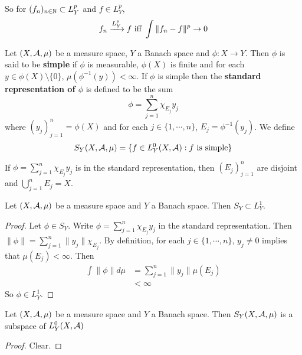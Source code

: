 \documentclass{book}
\begin{document}
	\begin{note}
	So for $(f_n)_{n \in \mathbb{N}} \subset L^p_Y$ and $f \in L^p_Y$, $$f_n \xrightarrow{L^p_Y} f \text{ iff } \int \|f_n - f\|^p \rightarrow 0$$ 
	\end{note}
	
	\begin{defn}  
	Let $(X, \mathcal{A}, \mu)$ be a measure space, $Y$ a Banach space and $\phi: X \rightarrow Y$. Then $\phi$ is said to be \textbf{simple} if $\phi$ is measurable, $\phi(X)$ is finite and for each $y \in \phi(X) \setminus \{0\}$, $\mu(\phi^{-1}(y)) < \infty$. If $\phi$ is simple then the \textbf{standard representation of $\phi$} is defined to be the sum $$\phi = \sum\limits_{j=1}^n \chi_{E_j}y_j$$ where $(y_j)_{j=1}^n = \phi(X)$ and for each $j \in \{1, \cdots, n\}$, $E_j = \phi^{-1}(y_j)$. We define $$S_Y(X, \mathcal{A}, \mu) = \{f \in L_Y^0(X, \mathcal{A}): f \text{ is simple}\}$$
	\end{defn}
	
	\begin{note}
	If $\phi = \sum\limits_{j=1}^n \chi_{E_j}y_j$ is in the standard representation, then $(E_j)_{j=1}^n$ are disjoint and $\bigcup\limits_{j=1}^n E_j = X$.
	\end{note}
	
	\begin{ex}
	Let $(X, \mathcal{A}, \mu)$ be a measure space and $Y$ a Banach space. Then $S_Y \subset L^1_Y$. 
	\end{ex}
	
	\begin{proof}
	Let $\phi \in S_Y$. Write $\phi = \sum\limits_{j=1}^n \chi_{E_j}y_j$ in the standard representation. Then $\|\phi\| = \sum\limits_{j=1}^n \|y_j\|\chi_{E_j}$. By definition, for each $j \in \{1, \cdots, n\}$, $y_j \neq 0$ implies that $\mu(E_j) < \infty$. Then 
	\begin{align*}
	\int \|\phi\| d\mu 
	&= \sum\limits_{j=1}^n \|y_j\| \mu(E_j) \\
	&< \infty
	\end{align*}
	So $\phi \in L^1_Y$.
	\end{proof}
	
	\begin{ex}  
	Let $(X, \mathcal{A}, \mu)$ be a measure space and $Y$ a Banach space. Then $S_Y(X, \mathcal{A}, \mu)$ is a subspace of $L_Y^0(X, \mathcal{A})$
	\end{ex}
	
	\begin{proof}
	Clear.
	\end{proof}
	
\end{document}
